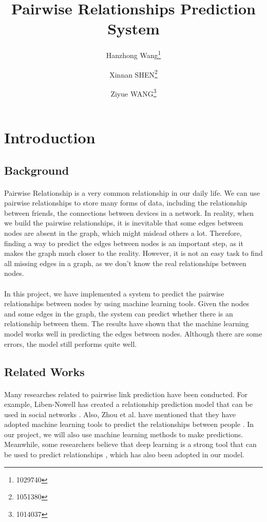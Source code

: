 \documentclass[fleqn,11pt]{olplainarticle}
\title{Pairwise Relationships Prediction System}
\author{Hanzhong Wang\thanks{1029740}}
\author{Xinnan SHEN\thanks{1051380}}
\author{Ziyue WANG\thanks{1014037}}
\affil{School of Computing and Information Systems, University of Melbourne}
\affil[]{\textit{\{hanzhongw,xinnan.shen, ziyue2\}}@student.unimelb.edu.au}
\begin{document}
\maketitle
\flushbottom
\thispagestyle{plain}
\pagestyle{plain}


\section{Introduction}\label{intro}

\subsection{Background}\label{bgd}
\paragraph*{}
Pairwise Relationship is a very common relationship in our daily life. We can use pairwise relationships to store many forms of data, including the relationship between friends, the connections between devices in a network. In reality, when we build the pairwise relationships, it is inevitable that some edges between nodes are absent in the graph, which might mislead others a lot. Therefore, finding a way to predict the edges between nodes is an important step, as it makes the graph much closer to the reality. However, it is not an easy task to find all missing edges in a graph, as we don't know the real relationships between nodes. 
\paragraph*{}
In this project, we have implemented a system to predict the pairwise relationships between nodes by using machine learning tools. Given the nodes and some edges in the graph, the system can predict whether there is an relationship between them. The results have shown that the machine learning model works well in predicting the edges between nodes. Although there are some errors, the model still performs quite well.

\subsection{Related Works}\label{relaw}
\paragraph{}
Many researches related to pairwise link prediction have been conducted. For example, Liben-Nowell has created a relationship prediction model that can be used in social networks \citep{liben2007link}. Also, Zhou et al. have mentioned that they have adopted machine learning tools to predict the relationships between people \citep{lu2011link}. In our project, we will also use machine learning methods to make predictions. Meanwhile, some researchers believe that deep learning is a strong tool that can be used to predict relationships \citep{wang2019}, which has also been adopted in our model.
\end{document}
